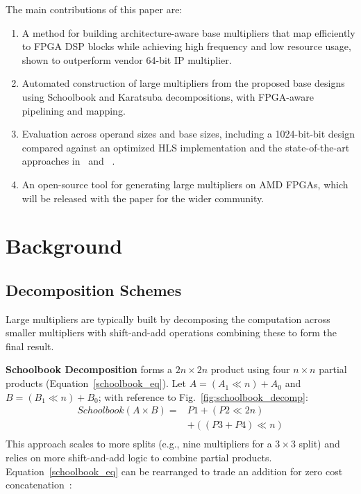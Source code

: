 \documentclass[conference]{IEEEtran}
\begin{document}
The main contributions of this paper are: 
\begin{enumerate}
    \item A method for building architecture-aware base multipliers that map efficiently to FPGA DSP blocks while achieving high frequency and low resource usage, shown to outperform vendor 64-bit IP multiplier.
    \item Automated construction of large multipliers from the proposed base designs using Schoolbook and Karatsuba decompositions, with FPGA-aware pipelining and mapping.
    \item Evaluation across operand sizes and base sizes, including a 1024-bit-bit design compared against an optimized HLS implementation and the state-of-the-art approaches in~\cite{zhangIMpressLargeInteger2022} and ~\cite{kummTilingHeuristics2020}.
    \item An open-source tool for generating large multipliers on AMD FPGAs, which will be released with the paper for the wider community.

\end{enumerate}



\section{Background} \label{sec_background}
\subsection{Decomposition Schemes}
Large multipliers are typically built by decomposing the computation across smaller multipliers with shift-and-add operations combining these to form the final result.

\noindent\textbf{Schoolbook Decomposition} forms a $2n\times 2n$ product using four $n\times n$ partial products (Equation~\ref{schoolbook_eq}). Let $A=(A_1\ll n)+A_0$ and $B=(B_1\ll n)+B_0$; with reference to Fig.~\ref{fig:schoolbook_decomp}:
\begin{equation} \label{schoolbook_eq}
\begin{split}
    \mathit{Schoolbook}(A \times B) = & P1 + (P2 \ll 2n) \\
                &+ ((P3+ P4) \ll n) \\
\end{split}
\end{equation}
This approach scales to more splits (e.g., nine multipliers for a $3\times 3$ split) and relies on more shift-and-add logic to combine partial products.
Equation~\ref{schoolbook_eq} can be rearranged to trade an addition for zero cost concatenation~\cite{zhangIMpressLargeInteger2022}:
\end{document}
